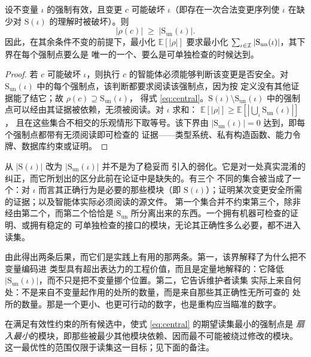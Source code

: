 \begin{theorem}[不变量集中化]\label{th:centralise}
设不变量 $\iota$ 的强制有效，且变更 $c$ 可能破坏 $\iota$（即存在一次合法变更序列使
$\iota$ 在缺少对 $\mathrm{S}(\iota)$ 的理解时被破坏）。则
\begin{equation}\label{eq:central}
|\rho(c)| \;\ge\; \bigl|\mathrm{S}_{\mathrm{un}}(\iota)\bigr| .
\end{equation}
因此，在其余条件不变的前提下，最小化 $\mathbb{E}[|\rho|]$ 要求最小化
$\sum_{\iota \in \mathcal{I}} |\mathrm{S}_{\mathrm{un}}(\iota)|$，其下界在每个强制点要么是
唯一的一个、要么是可单独检查的时候达到。
\end{theorem}

\begin{proof}
若 $c$ 可能破坏 $\iota$，则执行 $c$ 的智能体必须能够判断该变更是否安全。对
$\mathrm{S}_{\mathrm{un}}(\iota)$ 中的每个强制点，该判断都要求阅读该强制点，因为按
定义没有其他证据能了结它；故 $\rho(c) \supseteq \mathrm{S}_{\mathrm{un}}(\iota)$，
得式 \eqref{eq:central}。$\mathrm{S}(\iota) \setminus \mathrm{S}_{\mathrm{un}}(\iota)$
中的强制点可以经由其证据被依赖，无须被阅读。对 $\iota$ 求和：
$\mathbb{E}[|\rho|] \ge \mathbb{E}[|\bigcup_\iota \mathrm{S}_{\mathrm{un}}(\iota)|]$，
且在这些集合不相交的乐观情形下取等号。该下界由
$|\mathrm{S}_{\mathrm{un}}(\iota)| = 0$ 达到，即每个强制点都带有无须阅读即可检查的
证据——类型系统、私有构造函数、能力令牌、数据库约束或证明。
\end{proof}

从 $|\mathrm{S}(\iota)|$ 改为 $|\mathrm{S}_{\mathrm{un}}(\iota)|$ 并不是为了稳妥而
引入的弱化。它是对一处真实混淆的纠正，而它所划出的区分此前在论证中是缺失的。有三个
不同的集合被当成了一个：对 $\iota$ 而言其正确行为是必要的那些模块（即
$\mathrm{S}(\iota)$）；证明某次变更安全所需的证据；以及智能体实际必须阅读的源文件。
第一个集合并不约束第三个，除非经由第二个，而第二个恰恰是
$\mathrm{S}_{\mathrm{un}}$ 所分离出来的东西。一个拥有机器可检查的证明、或拥有稳定的
可单独检查的接口的模块，无论其正确性多么必要，都不进入读集。

由此得出两条后果，而它们是实践上有用的那两条。第一，该界解释了为什么把不变量编码进
类型具有超出表达力的工程价值，而且是定量地解释的：它降低
$|\mathrm{S}_{\mathrm{un}}(\iota)|$，而不只是把不变量挪个位置。第二，它告诉维护者读集
实际上来自何处：不是来自不变量起作用的处所的数量，而是来自那些其正确性无所可查的
处所的数量。那是一个更小、也更可行动的数字，也是重构应当瞄准的数字。

\begin{corollary}[强制点的最优位置]\label{cor:site}
在满足有效性约束的所有候选中，使式 \eqref{eq:central} 的期望读集最小的强制点是
\emph{扇入最小}的模块，即那些被最少其他模块依赖、因而最不可能被绕过修改的模块。
这一最优性的范围仅限于读集这一目标；见下面的备注。
\end{corollary}

